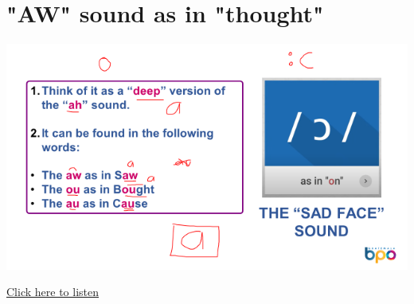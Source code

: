 \section{"AW" sound as in "thought" \textipa{/\textopeno/}}
\begin{center}
\includegraphics[width=1\textwidth]{images/sad_face_portrait.png}
\end{center}

\href{https://drive.google.com/file/d/154q9gt0WLnpRNkAjcv0uexXSiC0pnEYK/view?usp=drive_link}{Click here to listen}

